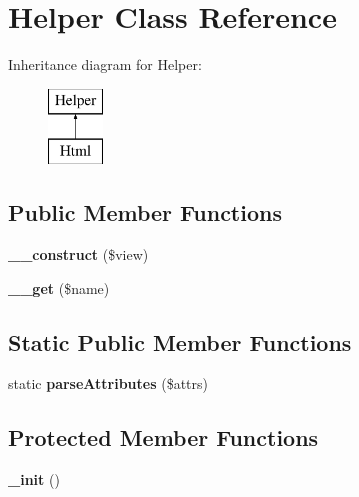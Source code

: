 \hypertarget{classHelper}{
\section{Helper Class Reference}
\label{classHelper}
}
Inheritance diagram for Helper:\begin{figure}[H]
\begin{center}
\leavevmode
\includegraphics[height=2.000000cm]{classHelper}
\end{center}
\end{figure}
\subsection*{Public Member Functions}
\begin{DoxyCompactItemize}
\item 
\hypertarget{classHelper_aaf7c48c91d7e53584b2f2d7e4cc655f2}{
{\bfseries \_\-\_\-construct} (\$view)}
\label{classHelper_aaf7c48c91d7e53584b2f2d7e4cc655f2}

\item 
\hypertarget{classHelper_af701de06437a148a3d0633924b723ee9}{
{\bfseries \_\-\_\-get} (\$name)}
\label{classHelper_af701de06437a148a3d0633924b723ee9}

\end{DoxyCompactItemize}
\subsection*{Static Public Member Functions}
\begin{DoxyCompactItemize}
\item 
\hypertarget{classHelper_a585a3be9064e2011a3f02b9e77ae1176}{
static {\bfseries parseAttributes} (\$attrs)}
\label{classHelper_a585a3be9064e2011a3f02b9e77ae1176}

\end{DoxyCompactItemize}
\subsection*{Protected Member Functions}
\begin{DoxyCompactItemize}
\item 
\hypertarget{classHelper_adbf673fb3f7c3b1ecd20e4815ed97af1}{
{\bfseries \_\-init} ()}
\label{classHelper_adbf673fb3f7c3b1ecd20e4815ed97af1}

\end{DoxyCompactItemize}
